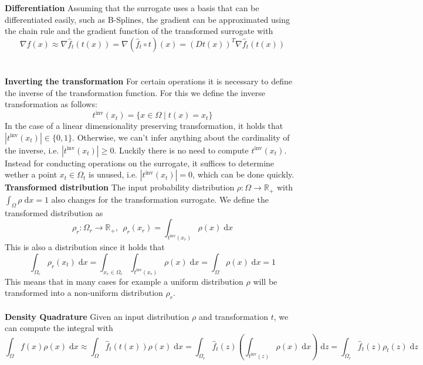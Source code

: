 \documentclass[
  a4paper,  %
  twoside,  %
  bibliography=totoc,
  headsepline,
  cleardoublepage=empty,
  parskip=half,
  draft=false
]{scrbook}
\begin{document}
\textbf{Differentiation }
Assuming that the surrogate uses a basis that can be differentiated easily, such as B-Splines, the gradient can be approximated using the chain rule and the gradient function of the transformed surrogate with
\begin{equation}
\nabla f(x) \approx \nabla \hat{f}_t(t(x)) = \nabla (\hat{f}_t \circ t)(x)=(Dt(x))^T \nabla \hat{f}_t(t(x))
\end{equation}
\\
\\
\textbf{Inverting the transformation  }
For certain operations it is necessary to define the inverse of the transformation function.
For this we define the inverse transformation as follows:
\begin{equation}
t^{\text{inv}}(x_{t})=\{x \in \Omega \mid t(x)=x_{t}\}
\end{equation}
In the case of a linear dimensionality preserving transformation, it holds that $|t^{\text{inv}}(x_{t})| \in \{0,1\}$.
Otherwise, we can't infer anything about the cardinality of the inverse, i.e. $|t^{\text{inv}}(x_{t})| \geq 0$.
Luckily there is no need to compute $t^{\text{inv}}(x_{t})$. Instead for conducting operations on the surrogate, it suffices to determine wether a point $x_t \in \Omega_t$ is unused, i.e. $|t^{\text{inv}}(x_{t})| = 0$, which can be done quickly.
\vspace{1em}
\textbf{Transformed distribution}
The input probability distribution $\rho \colon \Omega \to \mathds{R_+}$ with $\int_{\Omega} \rho \; \text{d}x = 1$ also changes for the transformation surrogate.
We define the transformed distribution as
\begin{equation}
\rho_r \colon \Omega_r \to \mathds{R_+}, ~~ \rho_r(x_r)=\int_{t^{\text{inv}}(x_r)} \rho(x) \; \text{d}x 
\end{equation}
This is also a distribution since it holds that
\begin{equation}
\int_{\Omega_r} \rho_r(x_t) \; \text{d}x=\int_{x_r \in \Omega_r} \int_{t^{\text{inv}}(x_r)} \rho(x) \; \text{d}x = \int_{\Omega} \rho(x) \; \text{d}x = 1
\end{equation}
This means that in many cases for example a uniform distribution $\rho$ will be transformed into a non-uniform distribution $\rho_r$.
\\
\\
\textbf{Density Quadrature}
Given an input distribution $\rho$ and transformation $t$, we can compute the integral with
\begin{equation}
\int_{\Omega} f(x) \rho(x) \; \text{d}x \approx \int_{\Omega} \hat{f}_t(t(x)) \rho(x) \; \text{d}x
=
\int_{\Omega_r} \hat{f}_t(z) \left(\int_{t^{\text{inv}}(z)} \rho(x)  \; \text{d}x \right)  \; \text{d}z=
\int_{\Omega_r} \hat{f}_t(z) \rho_t(z) \; \text{d}z
\end{equation}
\end{document}
